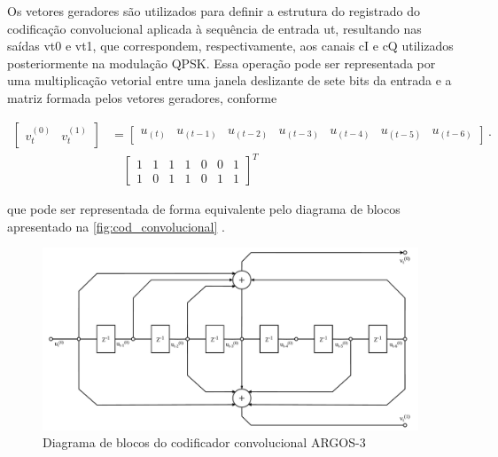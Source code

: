 Os vetores geradores são utilizados para definir a estrutura do registrado do codificação convolucional aplicada à sequência de entrada \gls{ut}, resultando nas saídas \gls{vt0} e \gls{vt1}, que correspondem, respectivamente, aos canais \gls{cI} e \gls{cQ} utilizados posteriormente na modulação \gls{QPSK}. Essa operação pode ser representada por uma multiplicação vetorial entre uma janela deslizante de sete bits da entrada e a matriz formada pelos vetores geradores, conforme

\begin{equation}
\begin{aligned}
    \begin{bmatrix}
        v_t^{(0)} & v_t^{(1)}
    \end{bmatrix}
    &=
    \begin{bmatrix}
        u_{(t)} & u_{(t-1)} & u_{(t-2)} & u_{(t-3)} & u_{(t-4)} & u_{(t-5)} & u_{(t-6)}
    \end{bmatrix} \cdot \\
    &\quad
    \begin{bmatrix}
        1 & 1 & 1 & 1 & 0 & 0 & 1 \\
        1 & 0 & 1 & 1 & 0 & 1 & 1
    \end{bmatrix}^{T}
\end{aligned}
\label{eq:matriz_geradora}
\end{equation}

\noindent que pode ser representada de forma equivalente pelo diagrama de blocos apresentado na \autoref{fig:cod_convolucional} \cite{cnes_services_and_message_formats_ed2_rev2_2006}.

\begin{figure}[H]
	\centering
	\caption{Diagrama de blocos do codificador convolucional ARGOS-3}
	\label{fig:cod_convolucional}
	\includegraphics[width=\linewidth]{assets/cod_convolucional.pdf}
\end{figure}


